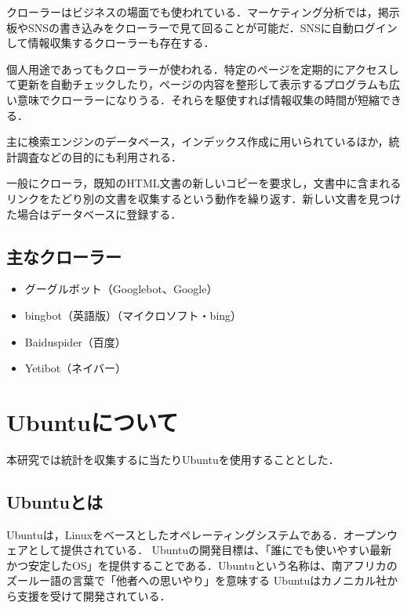 クローラーはビジネスの場面でも使われている．マーケティング分析では，掲示板やSNSの書き込みをクローラーで見て回ることが可能だ．SNSに自動ログインして情報収集するクローラーも存在する．

個人用途であってもクローラーが使われる．特定のページを定期的にアクセスして更新を自動チェックしたり，ページの内容を整形して表示するプログラムも広い意味でクローラーになりうる．それらを駆使すれば情報収集の時間が短縮できる\cite{sasakitakurou2014}．


主に検索エンジンのデータベース，インデックス作成に用いられているほか，統計調査などの目的にも利用される．

一般にクローラ，既知のHTML文書の新しいコピーを要求し，文書中に含まれるリンクをたどり別の文書を収集するという動作を繰り返す．新しい文書を見つけた場合はデータベースに登録する．


\section{主なクローラー}


\begin{itemize}
\setlength{\parskip}{3mm}

 \item	グーグルボット（Googlebot、Google）

 \item	bingbot（英語版）（マイクロソフト・bing）

 \item	Baiduspider（百度）

 \item	Yetibot（ネイバー）

\end{itemize}



\chapter{Ubuntuについて}

本研究では統計を収集するに当たりUbuntuを使用することとした．



\section{Ubuntuとは}

Ubuntuは，Linuxをベースとしたオペレーティングシステムである．オープンウェアとして提供されている．
Ubuntuの開発目標は、「誰にでも使いやすい最新かつ安定したOS」を提供することである．Ubuntuという名称は、南アフリカのズールー語の言葉で「他者への思いやり」を意味する 
Ubuntuはカノニカル社から支援を受けて開発されている．\cite{Ubuntu2015}


